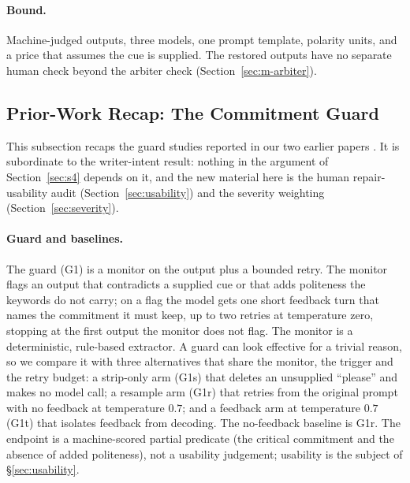 \paragraph{Bound.}
Machine-judged outputs, three models, one prompt template, \jmfOneUnitsPol{} polarity units, and a price that assumes the cue is supplied. The restored outputs have no separate human check beyond the arbiter check (Section~\ref{sec:m-arbiter}).

\subsection{Prior-Work Recap: The Commitment Guard}\label{sec:guard}

This subsection recaps the guard studies reported in our two earlier papers \cite{concurrent_se4all,concurrent_caleai}. It is subordinate to the writer-intent result: nothing in the argument of Section~\ref{sec:s4} depends on it, and the new material here is the human repair-usability audit (Section~\ref{sec:usability}) and the severity weighting (Section~\ref{sec:severity}).

\paragraph{Guard and baselines.}
The guard (G1) is a monitor on the output plus a bounded retry. The monitor flags an output that contradicts a supplied cue or that adds politeness the keywords do not carry; on a flag the model gets one short feedback turn that names the commitment it must keep, up to two retries at temperature zero, stopping at the first output the monitor does not flag. The monitor is a deterministic, rule-based extractor. A guard can look effective for a trivial reason, so we compare it with three alternatives that share the monitor, the trigger and the retry budget: a strip-only arm (G1s) that deletes an unsupplied ``please'' and makes no model call; a resample arm (G1r) that retries from the original prompt with no feedback at temperature $0.7$; and a feedback arm at temperature $0.7$ (G1t) that isolates feedback from decoding. The no-feedback baseline is G1r. The endpoint is a machine-scored partial predicate (the critical commitment and the absence of added politeness), not a usability judgement; usability is the subject of \S\ref{sec:usability}.

